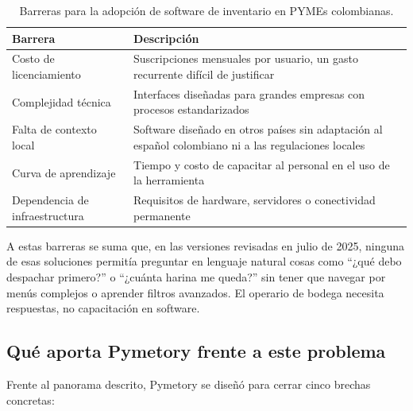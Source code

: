 \begin{table}[H]
\centering
\caption{Barreras para la adopción de software de inventario en PYMEs colombianas.}
\label{tab:barreras_pymes}
\begin{tabular}{|l|p{9cm}|}
\hline
\textbf{Barrera} & \textbf{Descripción} \\
\hline
Costo de licenciamiento & Suscripciones mensuales por usuario, un gasto recurrente difícil de justificar \\
\hline
Complejidad técnica & Interfaces diseñadas para grandes empresas con procesos estandarizados \\
\hline
Falta de contexto local & Software diseñado en otros países sin adaptación al español colombiano ni a las regulaciones locales \\
\hline
Curva de aprendizaje & Tiempo y costo de capacitar al personal en el uso de la herramienta \\
\hline
Dependencia de infraestructura & Requisitos de hardware, servidores o conectividad permanente \\
\hline
\end{tabular}
\end{table}

A estas barreras se suma que, en las versiones revisadas en julio de 2025, ninguna de esas soluciones permitía preguntar en lenguaje natural cosas como ``¿qué debo despachar primero?'' o ``¿cuánta harina me queda?'' sin tener que navegar por menús complejos o aprender filtros avanzados. El operario de bodega necesita respuestas, no capacitación en software.

\subsection{Qué aporta Pymetory frente a este problema}

Frente al panorama descrito, Pymetory se diseñó para cerrar cinco brechas concretas:

